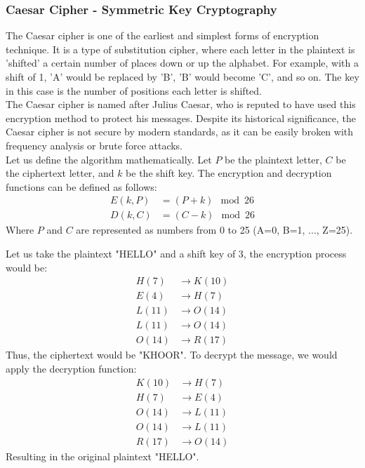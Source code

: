 \documentclass[openany]{book}
\begin{document}
\subsubsection{Caesar Cipher  - Symmetric Key Cryptography}
The Caesar cipher is one of the earliest and simplest forms of encryption technique. It is a type of substitution cipher, where each letter in the plaintext is 'shifted' a certain number of places down or up the alphabet. For example, with a shift of 1, 'A' would be replaced by 'B', 'B' would become 'C', and so on. The key in this case is the number of positions each letter is shifted. \\ 
The Caesar cipher is named after Julius Caesar, who is reputed to have used this encryption method to protect his messages. Despite its historical significance, the Caesar cipher is not secure by modern standards, as it can be easily broken with frequency analysis or brute force attacks. \\
Let us define the algorithm mathematically. Let \( P \) be the plaintext letter, \( C \) be the ciphertext letter, and \( k \) be the shift key. The encryption and decryption functions can be defined as follows:
\begin{align*}
    E(k, P) &= (P + k) \mod 26 \\
    D(k, C) &= (C - k) \mod 26
\end{align*}
Where \( P \) and \( C \) are represented as numbers from 0 to 25 (A=0, B=1, ..., Z=25). \\
\begin{example}
Let us take the plaintext "HELLO" and a shift key of 3, the encryption process would be:
\begin{align*}
    H (7) &\rightarrow K (10) \\
    E (4) &\rightarrow H (7) \\
    L (11) &\rightarrow O (14) \\
    L (11) &\rightarrow O (14) \\
    O (14) &\rightarrow R (17)
\end{align*}
Thus, the ciphertext would be "KHOOR". To decrypt the message, we would apply the decryption function:
\begin{align*}
    K (10) &\rightarrow H (7) \\
    H (7) &\rightarrow E (4) \\
    O (14) &\rightarrow L (11) \\
    O (14) &\rightarrow L (11) \\
    R (17) &\rightarrow O (14)
\end{align*}
Resulting in the original plaintext "HELLO". 
\end{example}
\end{document}
